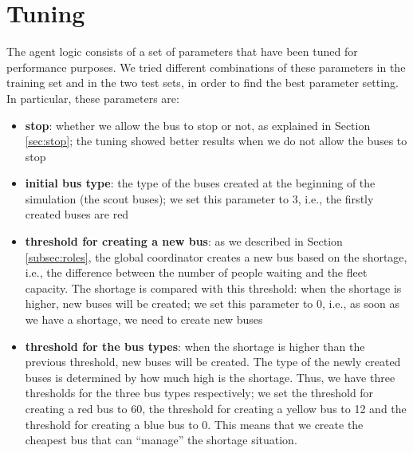 \section{Tuning}

The agent logic consists of a set of parameters that have been tuned for performance purposes. We tried different combinations of these parameters in the training set and in the two test sets, in order to find the best parameter setting. In particular, these parameters are:

\begin{itemize}
\item \textbf{stop}: whether we allow the bus to stop or not, as explained in Section \ref{sec:stop}; the tuning showed better results when we do not allow the buses to stop
\item \textbf{initial bus type}: the type of the buses created at the beginning of the simulation (the scout buses); we set this parameter to 3, i.e., the firstly created buses are red
\item \textbf{threshold for creating a new bus}: as we described in Section \ref{subsec:roles}, the global coordinator creates a new bus based on the shortage, i.e., the difference between the number of people waiting and the fleet capacity. The shortage is compared with this threshold: when the shortage is higher, new buses will be created; we set this parameter to 0, i.e., as soon as we have a shortage, we need to create new buses
\item \textbf{threshold for the bus types}: when the shortage is higher than the previous threshold, new buses will be created. The type of the newly created buses is determined by how much high is the shortage. Thus, we have three thresholds for the three bus types respectively; we set the threshold for creating a red bus to 60, the threshold for creating a yellow bus to 12 and the threshold for creating a blue bus to 0. This means that we create the cheapest bus that can ``manage'' the shortage situation. 
\end{itemize}
